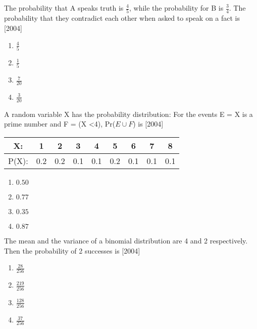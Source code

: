     \item The probability that A speaks truth is $\frac{4}{5}$, while the probability for B is $\frac{3}{4}$. The probability that they contradict each other when asked to speak on a fact is  \hfill [2004]

        \begin{multicols}{4}
        \begin{enumerate}
            \item $\frac{4}{5}$
            \item $\frac{1}{5}$
            \item $\frac{7}{20}$
            \item $\frac{3}{20}$   
        \end{enumerate}
        \end{multicols}

        
    \item A random variable X has the probability distribution: For the events E = {X is a prime number } and F = (X \textless  4), Pr(\(E \cup F\)) is \hfill [2004]

        \begin{table}[h!]
        \centering
        \begin{tabular}{|c|c|c|c|c|c|c|c|c|}
        \hline
            X: &1&2&3&4&5&6&7&8 \\
            \hline
        P(X):&0.2&0.2&0.1&0.1&0.2&0.1&0.1&0.1\\
        \hline
        \end{tabular}
            \end{table}


        \begin{multicols}{4}
        \begin{enumerate}
            \item $0.50$
            \item $0.77$
            \item $0.35$
            \item $0.87$   
        \end{enumerate}
        \end{multicols}


    \item The mean and the variance of a binomial distribution are 4 and 2 respectively. Then the probability of 2 successes is   \hfill [2004]

        \begin{multicols}{4}
        \begin{enumerate}
            \item $\frac{28}{256}$
            \item $\frac{219}{256}$
            \item $\frac{128}{256}$
            \item $\frac{37}{256}$   
        \end{enumerate}
        \end{multicols}


